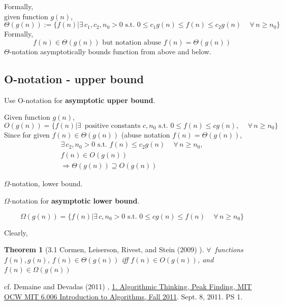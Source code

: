 \documentclass[10pt]{amsart}
\newtheorem{theorem}{Theorem}
\begin{document}
\begin{multicols*}{2}
Formally, \\
given function $g(n)$, 
\begin{equation}
\Theta(g(n)) := \lbrace f(n) | \exists \, c_1, c_2, n_0 > 0 \text{ s.t. } 0 \leq c_1 g(n) \leq f(n) \leq c_2 g(n) \quad \, \forall \, n \geq n_0 \rbrace 
\end{equation}
Formally, \\
\[
f(n) \in \Theta (g(n)) \text{ but notation abuse } f(n) = \Theta(g(n))
\]
$\Theta$-notation asymptotically bounds function from above and below.

\subsection{O-notation - upper bound}

Use O-notation for \textbf{asymptotic upper bound}.

Given function $g(n)$, 
\begin{equation}
O(g(n)) = \lbrace f(n) | \exists \, \text{ positive constants } c, n_0 \text{ s.t. } 0 \leq f(n) \leq c g(n), \quad \, \forall \, n \geq n_0 \rbrace 
\end{equation}
Since for given $f(n) \in \Theta(g(n))$ (abuse notation $f(n) = \Theta(g(n))$, 
\[
\begin{gathered} 
\exists \, c_2, n_0 > 0 \text{ s.t. } f(n) \leq c_2 g(n) \quad \, \forall \, n \geq n_0, \\
f(n) \in O(g(n)) \\
\Longrightarrow \Theta(g(n)) \supseteq O(g(n))
\end{gathered}
\]

$\Omega$-notation, lower bound.

$\Omega$-notation for \textbf{asymptotic lower bound}.

\begin{equation}
\Omega(g(n)) = \lbrace f(n) | \exists \, c, n_0 >0 \text{ s.t. } 0 \leq cg(n) \leq f(n) \quad \, \forall \, n \geq n_0 \rbrace 
\end{equation}

Clearly,
\begin{theorem}[3.1 Cormen, Leiserson, Rivest, and Stein (2009) \cite{CLRS2009}]
$\forall \, $ functions $f(n), g(n)$, $f(n) \in \Theta(g(n))$ iff $f(n) \in O(g(n))$, and $f(n) \in \Omega(g(n))$
\end{theorem}


cf. Demaine and Devadas (2011) \cite{DeDe2001}, \href{https://youtu.be/HtSuA80QTyo}{1. Algorithmic Thinking, Peak Finding, MIT OCW MIT 6.006 Introduction to Algorithms, Fall 2011}. Sept. 8, 2011. PS 1.


\end{multicols*}
\end{document}
